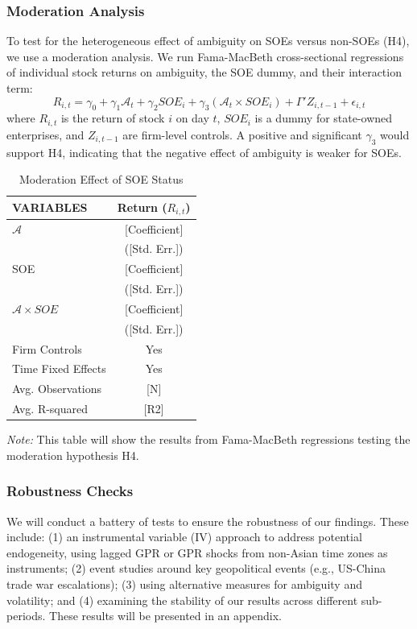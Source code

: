 \documentclass[preprint,12pt,authoryear]{elsarticle}
\begin{document}
\subsubsection{Moderation Analysis}
To test for the heterogeneous effect of ambiguity on SOEs versus non-SOEs (H4), we use a moderation analysis. We run Fama-MacBeth cross-sectional regressions of individual stock returns on ambiguity, the SOE dummy, and their interaction term:
\begin{equation}
R_{i,t} = \gamma_0 + \gamma_1 \mathcal{A}_t + \gamma_2 SOE_i + \gamma_3 (\mathcal{A}_t \times SOE_i) + \Gamma'Z_{i,t-1} + \epsilon_{i,t}
\end{equation}
where $R_{i,t}$ is the return of stock $i$ on day $t$, $SOE_i$ is a dummy for state-owned enterprises, and $Z_{i,t-1}$ are firm-level controls. A positive and significant $\gamma_3$ would support H4, indicating that the negative effect of ambiguity is weaker for SOEs.

\begin{table}[H]
\centering
\caption{Moderation Effect of SOE Status}
\label{tab:moderation}
\begin{threeparttable}
\begin{tabular}{lc}
\toprule
VARIABLES & Return ($R_{i,t}$) \\
\midrule
$\mathcal{A}$ & [Coefficient] \\
 & ([Std. Err.]) \\
SOE & [Coefficient] \\
 & ([Std. Err.]) \\
$\mathcal{A} \times SOE$ & [Coefficient] \\
 & ([Std. Err.]) \\
Firm Controls & Yes \\
Time Fixed Effects & Yes \\
\midrule
Avg. Observations & [N] \\
Avg. R-squared & [R2] \\
\bottomrule
\end{tabular}
\begin{tablenotes}
\item \textit{Note:} This table will show the results from Fama-MacBeth regressions testing the moderation hypothesis H4.
\end{tablenotes}
\end{threeparttable}
\end{table}

\subsubsection{Robustness Checks}
We will conduct a battery of tests to ensure the robustness of our findings. These include: (1) an instrumental variable (IV) approach to address potential endogeneity, using lagged GPR or GPR shocks from non-Asian time zones as instruments; (2) event studies around key geopolitical events (e.g., US-China trade war escalations); (3) using alternative measures for ambiguity and volatility; and (4) examining the stability of our results across different sub-periods. These results will be presented in an appendix.
\end{document}
